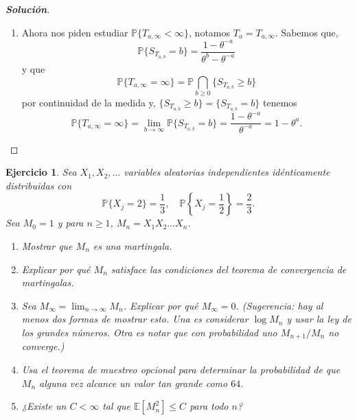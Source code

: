 \documentclass[11pt]{article}
\theoremstyle{ejstyle}
\newtheorem{ejercicio}{Ejercicio}
\newenvironment{solucion}
{\begin{proof}[{\bfseries\color{deepindigo} Solución}]}
	{\end{proof}}
\begin{document}
\begin{solucion}
\begin{enumerate}
			\item Ahora nos piden estudiar $\mathbb{P}\{T_{a,\infty} < \infty\}$, notamos $T_a = T_{a, \infty}$. Sabemos que,
			$$
			\mathbb{P}\{S_{T_{a, b}} = b\} = \frac{1 - \theta^{-a}}{\theta^{b} - \theta^{-a} }
			$$
			y que
			$$
				\mathbb{P}\{T_{a,\infty} = \infty\}	= \mathbb{P} \bigcap_{b \geq 0}  \{ S_{T_{a, b}} \geq b\}
			$$
			por continuidad de la medida y, $\{ S_{T_{a, b}} \geq b\} = \{ S_{T_{a, b}} = b\}$ tenemos 
			$$
				\mathbb{P}\{T_{a,\infty} = \infty\} = \lim\limits_{b \to \infty} \mathbb{P}\{S_{T_{a, b}} = b\} =  \frac{1 - \theta^{-a}}{\theta^{-a}} = 1 - \theta^{a}.
			$$
		\end{enumerate}
		 
	\end{solucion}
	
	\begin{ejercicio}
			Sea $X_1, X_2, \ldots$ variables aleatorias independientes idénticamente distribuidas con
			$$\mathbb{P}\{X_j = 2\} = \frac{1}{3}, \quad \mathbb{P}\left\{X_j = \frac{1}{2}\right\} = \frac{2}{3}.$$
			Sea $M_0 = 1$ y para $n \geq 1$, $M_n = X_1 X_2 \ldots X_n$.
			\begin{enumerate}
				\item Mostrar que $M_n$ es una martingala.
				\item Explicar por qué $M_n$ satisface las condiciones del teorema de convergencia de martingalas.
				\item Sea $M_\infty = \lim_{n \to \infty} M_n$. Explicar por qué $M_\infty = 0$. (Sugerencia: hay al menos dos formas de mostrar esto. Una es considerar $\log M_n$ y usar la ley de los grandes números. Otra es notar que con probabilidad uno $M_{n+1}/M_n$ no converge.)
				\item Usa el teorema de muestreo opcional para determinar la probabilidad de que $M_n$ alguna vez alcance un valor tan grande como $64$.
				\item ¿Existe un $C < \infty$ tal que $\mathbb{E}[M_n^2] \leq C$ para todo $n$?
			\end{enumerate}
	\end{ejercicio}
	
\end{document}
